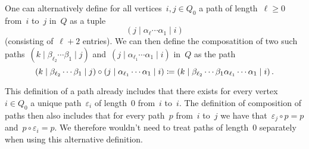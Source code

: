 \begin{remark*}
  One can alternatively define for all vertices~$i, j \in Q_0$ a path of length~$\ell \geq 0$ from~$i$ to~$j$ in~$Q$ as a tuple
  \[
    (j \mid \alpha_\ell \dotsm \alpha_1 \mid i)
  \]
  (consisting of~$\ell + 2$ entries).
  We can then define the composatition of two such paths~$(k \mid \beta_{\ell_2} \dotsm \beta_1 \mid j)$ and~$(j \mid \alpha_{\ell_1} \dotsm \alpha_1 \mid i)$ in~$Q$ as the path
  \[
    (k \mid \beta_{\ell_2} \dotsm \beta_1 \mid j)
    \circ
    (j \mid \alpha_{\ell_1} \dotsm \alpha_1 \mid i)
    \coloneqq
    (k \mid \beta_{\ell_2} \dotsm \beta_1 \alpha_{\ell_1} \dotsm \alpha_1 \mid i) \,.
  \]
  
  This definition of a path already includes that there exists for every vertex~$i \in Q_0$ a unique path~$\varepsilon_i$ of length~$0$ from~$i$ to~$i$.
  The definition of composition of paths then also includes that for every path~$p$ from~$i$ to~$j$ we have that~$\varepsilon_j \circ p = p$ and~$p \circ \varepsilon_i = p$.
  We therefore wouldn’t need to treat paths of length~$0$ separately when using this alternative definition.
\end{remark*}


